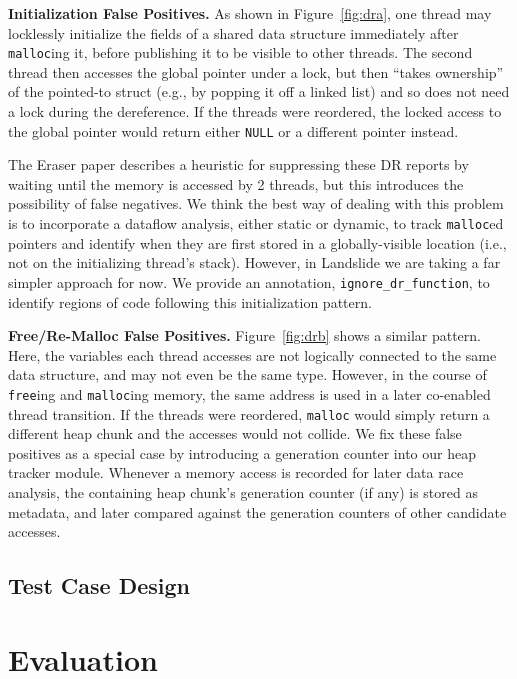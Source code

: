 \documentclass{article}
\begin{document}
{\bf Initialization False Positives.} As shown in Figure~\ref{fig:dra}, one thread may locklessly initialize the fields of a shared data structure immediately after {\tt malloc}ing it, before publishing it to be visible to other threads. The second thread then accesses the global pointer under a lock, but then ``takes ownership'' of the pointed-to struct (e.g., by popping it off a linked list) and so does not need a lock during the dereference. If the threads were reordered, the locked access to the global pointer would return either {\tt NULL} or a different pointer instead.

The Eraser paper \cite{eraser} describes a heuristic for suppressing these DR reports by waiting until the memory is accessed by 2 threads, but this introduces the possibility of false negatives.
We think the best way of dealing with this problem is to incorporate a dataflow analysis, either static or dynamic, to track {\tt malloc}ed pointers and identify when they are first stored in a globally-visible location (i.e., not on the initializing thread's stack).
However, in Landslide we are taking a far simpler approach for now. We provide an annotation, {\tt ignore\_dr\_function}, to identify regions of code following this initialization pattern.

{\bf Free/Re-Malloc False Positives.} Figure~\ref{fig:drb} shows a similar pattern. Here, the variables each thread accesses are not logically connected to the same data structure, and may not even be the same type. However, in the course of {\tt free}ing and {\tt malloc}ing memory, the same address is used in a later co-enabled thread transition. If the threads were reordered, {\tt malloc} would simply return a different heap chunk and the accesses would not collide. We fix these false positives as a special case by introducing a generation counter into our heap tracker module. Whenever a memory access is recorded for later data race analysis, the containing heap chunk's generation counter (if any) is stored as metadata, and later compared against the generation counters of other candidate accesses.

\subsection{Test Case Design}

\section{Evaluation}
\end{document}
